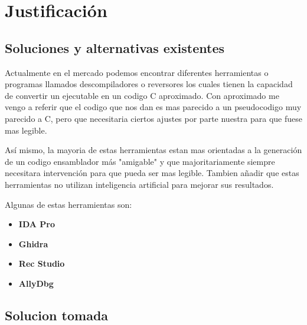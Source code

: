 \chapter{Justificación}
\label{cap:justificacion}

\section{Soluciones y alternativas existentes}
\label{sec:alternativas}

Actualmente en el mercado podemos encontrar diferentes herramientas o programas llamados descompiladores o reversores los cuales tienen la capacidad de convertir un ejecutable
en un codigo C aproximado. Con aproximado me vengo a referir que el codigo que nos dan es mas parecido a un pseudocodigo muy parecido a C, pero que necesitaria ciertos ajustes
por parte nuestra para que fuese mas legible.

Así mismo, la mayoria de estas herramientas estan mas orientadas a la generación de un codigo ensamblador más "amigable" y que majoritariamente siempre necesitara intervención
para que pueda ser mas legible. Tambien añadir que estas herramientas no utilizan inteligencia artificial para mejorar sus resultados.

Algunas de estas herramientas son:

\begin{itemize}
    \item \bf IDA Pro
    \item \bf Ghidra
    \item \bf Rec Studio
    \item \bf AllyDbg
\end{itemize}

\section{Solucion tomada}
\label{sec:solucion}
